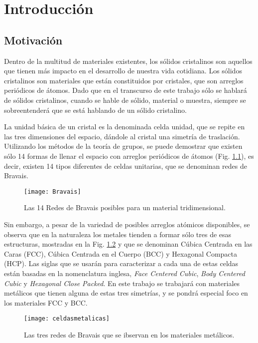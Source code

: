 \chapter{Introducción}
\graphicspath{{./figs/01_intro/}}
\section{Motivación}\label{S:motivacion}
Dentro de la multitud de materiales existentes, los sólidos cristalinos son aquellos que tienen más impacto en el desarrollo de nuestra vida cotidiana. 
Los sólidos cristalinos son materiales que están constituidos por cristales, que son arreglos periódicos de átomos. 
Dado que en el transcurso de este trabajo sólo se hablará de sólidos cristalinos, cuando se hable de sólido, material o muestra, siempre se sobreentenderá que se está hablando de un sólido cristalino.

La unidad básica de un cristal es la denominada celda unidad, que se repite en las tres dimensiones del espacio, dándole al cristal una simetría de traslación. Utilizando los métodos de la teoría de grupos, se puede demostrar que existen sólo 14 formas de llenar el espacio con arreglos periódicos de átomos (Fig. \ref{fig:Bravais}), es decir, existen 14 tipos diferentes de celdas unitarias, que se denominan redes de Bravais\cite{hahn2005international}.

\begin{figure}[h!]
  \centering
  \texttt{[image: Bravais]}
  \caption{Las 14 Redes de Bravais posibles para un material tridimensional.}
  \label{fig:Bravais}
\end{figure}

Sin embargo, a pesar de la variedad de posibles arreglos atómicos disponibles, se observa que en la naturaleza los metales tienden a formar sólo tres de esas estructuras, mostradas en la Fig. \ref{fig:celdasmetalicas} y que se denominan Cúbica Centrada en las Caras (FCC), Cúbica Centrada en el Cuerpo (BCC) y Hexagonal Compacta (HCP). Las siglas que se usarán para caracterizar a cada una de estas celdas están basadas en la nomenclatura inglesa, \textit{Face Centered Cubic}, \textit{Body Centered Cubic} y \textit{Hexagonal Close Packed}. En este trabajo se trabajará con materiales metálicos que tienen alguna de estas tres simetrías, y se pondrá especial foco en los materiales FCC y BCC.

\begin{figure}[h!]
  \centering
  \texttt{[image: celdasmetalicas]}
  \caption{Las tres redes de Bravais que se ibservan en los materiales metálicos.}
  \label{fig:celdasmetalicas}
\end{figure}

